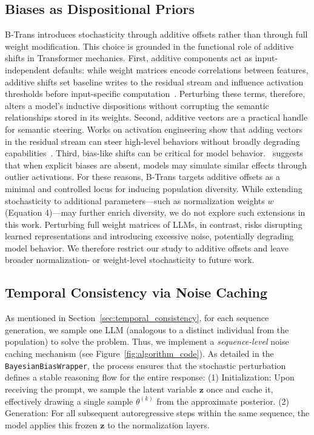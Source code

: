 \documentclass[11pt]{article}
\begin{document}
\subsection{Biases as Dispositional Priors}
\label{subsec:why_biases}
B-Trans introduces stochasticity through additive offsets rather than through full weight modification. 
This choice is grounded in the functional role of additive shifts in Transformer mechanics. 
First, additive components act as input-independent defaults: while weight matrices encode correlations between features, additive shifts set baseline writes to the residual stream and influence activation thresholds before input-specific computation~\cite{elhage2021mathematical}. Perturbing these terms, therefore, alters a model’s inductive dispositions without corrupting the semantic relationships stored in its weights.
Second, additive vectors are a practical handle for semantic steering. Works on activation engineering show that adding vectors in the residual stream can steer high-level behaviors without broadly degrading capabilities~\cite{turner2023steering, zou2023representation}. 
Third, bias-like shifts can be critical for model behavior.~\citet{sun2024massive} suggests that when explicit biases are absent, models may simulate similar effects through outlier activations. 
For these reasons, B-Trans targets additive offsets as a minimal and controlled locus for inducing population diversity. While extending stochasticity to additional parameters—such as normalization weights 
$w$ (Equation 4)—may further enrich diversity, we do not explore such extensions in this work. Perturbing full weight matrices of LLMs, in contrast, risks disrupting learned representations and introducing excessive noise, potentially degrading model behavior. We therefore restrict our study to additive offsets and leave broader normalization- or weight-level stochasticity to future work.

\subsection{Temporal Consistency via Noise Caching}
As mentioned in Section~\ref{sec:temporal_consistency}, for each sequence generation, we sample one LLM (analogous to a distinct individual from the population) to solve the problem.
Thus, we implement a \textit{sequence-level} noise caching mechanism (see Figure~\ref{fig:algorithm_code}). As detailed in the \texttt{BayesianBiasWrapper}, the process ensures that the stochastic perturbation defines a stable reasoning flow for the entire response:
(1) Initialization: Upon receiving the prompt, we sample the latent variable $\mathbf{z}$ once and cache it, effectively drawing a single sample $\theta^{(k)}$ from the approximate posterior.
(2) Generation: For all subsequent autoregressive steps within the same sequence, the model applies this frozen $\mathbf{z}$ to the normalization layers.
\end{document}
